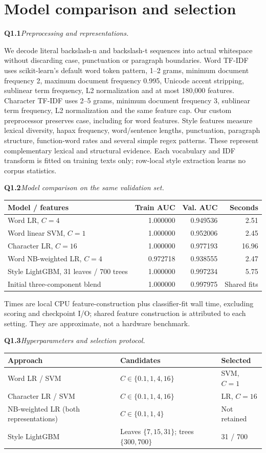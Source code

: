 \documentclass[10pt,letterpaper]{article}
\newcommand{\q}[2]{\needspace{4\baselineskip}\par\addvspace{7pt}\textbf{#1}\quad\textit{#2}\par\nobreak}
\begin{document}
\section{Model comparison and selection}
\q{Q1.1}{Preprocessing and representations.}
We decode literal backslash-n and backslash-t sequences into actual whitespace without discarding case, punctuation or paragraph boundaries.
Word TF-IDF uses scikit-learn's default word token pattern, 1--2 grams, minimum document frequency 2, maximum document frequency 0.995, Unicode accent stripping, sublinear term frequency, L2 normalization and at most 180,000 features.
Character TF-IDF uses 2--5 grams, minimum document frequency 3, sublinear term frequency, L2 normalization and the same feature cap.
Our custom preprocessor preserves case, including for word features.
Style features measure lexical diversity, hapax frequency, word/sentence lengths, punctuation, paragraph structure, function-word rates and several simple regex patterns.
These represent complementary lexical and structural evidence.
Each vocabulary and IDF transform is fitted on training texts only; row-local style extraction learns no corpus statistics.
\q{Q1.2}{Model comparison on the same validation set.}
\begin{tabularx}{\linewidth}{@{}Yrrr@{}}
\toprule
Model / features & Train AUC & Val. AUC & Seconds \\ \midrule
Word LR, $C=4$ & 1.000000 & 0.949536 & 2.51 \\
Word linear SVM, $C=1$ & 1.000000 & 0.952006 & 2.45 \\
Character LR, $C=16$ & 1.000000 & 0.977193 & 16.96 \\
Word NB-weighted LR, $C=4$ & 0.972718 & 0.938555 & 2.47 \\
Style LightGBM, 31 leaves / 700 trees & 1.000000 & 0.997234 & 5.75 \\
Initial three-component blend & 1.000000 & 0.997975 & Shared fits \\
\bottomrule
\end{tabularx}

\small Times are local CPU feature-construction plus classifier-fit wall time, excluding scoring and checkpoint I/O; shared feature construction is attributed to each setting. They are approximate, not a hardware benchmark.\normalsize
\q{Q1.3}{Hyperparameters and selection protocol.}
\begin{tabularx}{\linewidth}{@{}YYl@{}}
\toprule
Approach & Candidates & Selected \\ \midrule
Word LR / SVM & $C\in\{0.1,1,4,16\}$ & SVM, $C=1$ \\
Character LR / SVM & $C\in\{0.1,1,4,16\}$ & LR, $C=16$ \\
NB-weighted LR (both representations) & $C\in\{0.1,1,4\}$ & Not retained \\
Style LightGBM & Leaves $\{7,15,31\}$; trees $\{300,700\}$ & 31 / 700 \\
\bottomrule
\end{tabularx}
\end{document}
